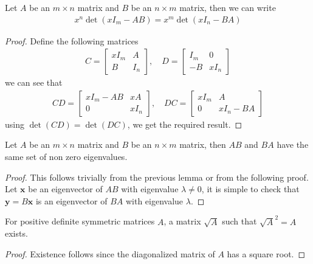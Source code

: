 \documentclass{math}
\renewcommand{\vec}[1]{\boldsymbol{#1}}
\begin{document}
\begin{lemma}\label{lemma:sylvester}
    Let $A$ be an $m \times n$ matrix and $B$ be an $n \times m$ matrix, then we can write
    \begin{align*}
        x^n\det(xI_m - AB) = x^m\det(xI_n - BA)
    \end{align*}
\end{lemma}
\begin{proof}
    Define the following matrices
    \begin{align*}
        C = \begin{bmatrix}
                xI_m & A   \\
                B    & I_n
            \end{bmatrix},\quad
        D = \begin{bmatrix}
                I_m & 0    \\
                -B  & xI_n
            \end{bmatrix}
    \end{align*}
    we can see that
    \begin{align*}
        CD = \begin{bmatrix}
                 xI_m - AB & xA   \\
                 0         & xI_n
             \end{bmatrix},\quad
        DC = \begin{bmatrix}
                 xI_m & A         \\
                 0    & xI_n - BA
             \end{bmatrix}
    \end{align*}
    using $\det(CD) = \det(DC)$, we get the required result.
\end{proof}

\begin{lemma}
    Let $A$ be an $m \times n$ matrix and $B$ be an $n \times m$ matrix, then $AB$ and $BA$ have the same set of non zero eigenvalues.
\end{lemma}
\begin{proof}
    This follows trivially from the previous lemma or from the following proof.
    Let $\vec{x}$ be an eigenvector of $AB$ with eigenvalue $\lambda \neq 0$, it is simple to check that $\vec{y} = B\vec{x}$ is an eigenvector of $BA$ with eigenvalue $\lambda$.
\end{proof}

\begin{lemma}
    For positive definite symmetric matrices $A$, a matrix $\sqrt{A}$ such that $\sqrt{A}^2 = A$ exists.
\end{lemma}
\begin{proof}
    Existence follows since the diagonalized matrix of $A$ has a square root.
\end{proof}
\end{document}

